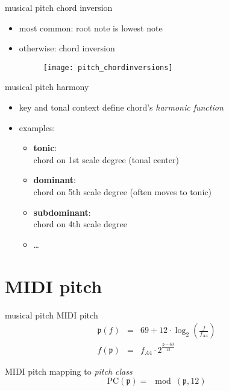         \begin{frame}{musical pitch}{ chord inversion}
            \begin{itemize}
                \item	most common: root note is lowest note
                \item	otherwise: chord inversion
                \begin{figure}[t]
                    \centering
                    \texttt{[image: pitch\_chordinversions]}
                \end{figure}
                
            \end{itemize}
        \end{frame}
        
        \begin{frame}{musical pitch}{ harmony}
            \begin{itemize}
                \item	key and tonal context define chord's \textit{harmonic function}
                \smallskip
                \item   examples:
                \begin{itemize}
                    \item	\textbf{tonic}:\\ chord on 1st scale degree (tonal center)
                    \item	\textbf{dominant}:\\ chord on 5th scale degree (often moves to tonic)
                    \item	\textbf{subdominant}:\\ chord on 4th scale degree
                    \item	\ldots
                \end{itemize}
            \end{itemize}
        \end{frame}

    \section{MIDI pitch}
        \begin{frame}{musical pitch}{ MIDI pitch}
                \begin{eqnarray*}\label{eq:midi_pitch}
                    \mathfrak{p}(f) &=& 69 + 12\cdot\log_2\left(\frac{f}{f_\mathrm{A4}}\right) \\
                    f(\mathfrak{p}) &=& f_{A4}\cdot2^{\frac{\mathfrak{p}-69}{12}}
                \end{eqnarray*}
                
                \pause
                MIDI pitch mapping to \textit{pitch class}
                \begin{equation*}\label{eq:pcidx}
                    \mathrm{PC}(\mathfrak{p}) = \mod(\mathfrak{p}, 12) 
                \end{equation*}
                
        \end{frame}
    
